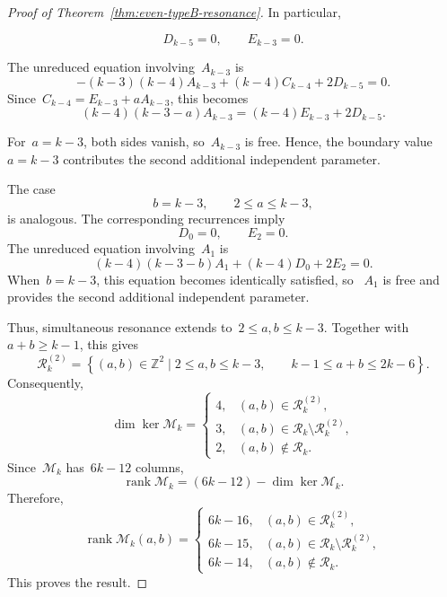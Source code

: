 \documentclass[12pt,a4paper]{amsart}
\theoremstyle{thm}
\theoremstyle{definition}
\begin{document}
\begin{proof}[Proof of Theorem~\textup{\ref{thm:even-typeB-resonance}}]
In particular,

\[
D_{k-5}=0,
\qquad
E_{k-3}=0.
\]

The unreduced equation involving~\(A_{k-3}\) is
\[
-(k-3)(k-4)A_{k-3}
+
(k-4)C_{k-4}
+
2D_{k-5}=0.
\]
Since~$C_{k-4}=E_{k-3}+aA_{k-3}$,
this becomes
\[
(k-4)(k-3-a)A_{k-3}
=
(k-4)E_{k-3}+2D_{k-5}.
\]

For~\(a=k-3\), both sides vanish, so~\(A_{k-3}\) is free. Hence, the
boundary value~\(a=k-3\) contributes the second additional independent
parameter.

The case
\[
b=k-3,
\qquad
2\leq a\leq k-3,
\]
is analogous. The corresponding recurrences imply
\[
D_0=0,
\qquad
E_2=0.
\]
The unreduced equation involving~\(A_1\) is
\[
(k-4)(k-3-b)A_1
+
(k-4)D_0
+
2E_2=0.
\]
When~\(b=k-3\), this equation becomes identically satisfied, so~%
\(A_1\) is free and provides the second additional independent
parameter.

Thus, simultaneous resonance extends to~$2\leq a,b\leq k-3$.
Together with~$a+b\geq k-1$,
this gives
\[
\mathcal R_k^{(2)}
=
\left\{
(a,b)\in\mathbb Z^2\mid
2\leq a,b\leq k-3,\qquad
k-1\leq a+b\leq2k-6
\right\}.
\]
Consequently,
\[
\dim\ker\mathcal M_k
=
\begin{cases}
4,
&(a,b)\in\mathcal R_k^{(2)},\\[1mm]
3,
&(a,b)\in
\mathcal R_k\setminus\mathcal R_k^{(2)},\\[1mm]
2,
&(a,b)\notin\mathcal R_k.
\end{cases}
\]
Since~\(\mathcal M_k\) has~\(6k-12\) columns,
\[
\operatorname{rank}\mathcal M_k
=
(6k-12)-\dim\ker\mathcal M_k.
\]
Therefore,
\[
\operatorname{rank}\mathcal M_k(a,b)
=
\begin{cases}
6k-16,
&(a,b)\in\mathcal R_k^{(2)},\\[1mm]
6k-15,
&(a,b)\in
\mathcal R_k\setminus\mathcal R_k^{(2)},\\[1mm]
6k-14,
&(a,b)\notin\mathcal R_k.
\end{cases}
\]
This proves the result.
\end{proof}
\end{document}
